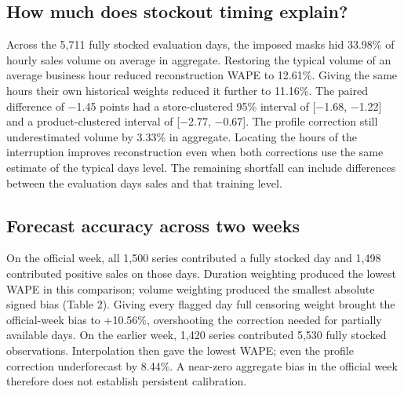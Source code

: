 \documentclass[11pt,a4paper]{article}
\begin{document}
\subsection{How much does stockout timing explain?}

Across the 5,711 fully stocked evaluation days, the imposed masks hid 33.98\% of hourly sales volume on average in aggregate. Restoring the typical volume of an average business hour reduced reconstruction WAPE to 12.61\%. Giving the same hours their own historical weights reduced it further to 11.16\%. The paired difference of \ensuremath{-}1.45 points had a store-clustered 95\% interval of {[}\ensuremath{-}1.68, \ensuremath{-}1.22{]} and a product-clustered interval of {[}\ensuremath{-}2.77, \ensuremath{-}0.67{]}. The profile correction still underestimated volume by 3.33\% in aggregate. Locating the hours of the interruption improves reconstruction even when both corrections use the same estimate of the typical day\textquotesingle s level. The remaining shortfall can include differences between the evaluation day\textquotesingle s sales and that training level.

\subsection{Forecast accuracy across two weeks}

On the official week, all 1,500 series contributed a fully stocked day and 1,498 contributed positive sales on those days. Duration weighting produced the lowest WAPE in this comparison; volume weighting produced the smallest absolute signed bias (Table 2). Giving every flagged day full censoring weight brought the official-week bias to +10.56\%, overshooting the correction needed for partially available days. On the earlier week, 1,420 series contributed 5,530 fully stocked observations. Interpolation then gave the lowest WAPE; even the profile correction underforecast by 8.44\%. A near-zero aggregate bias in the official week therefore does not establish persistent calibration.
\end{document}
